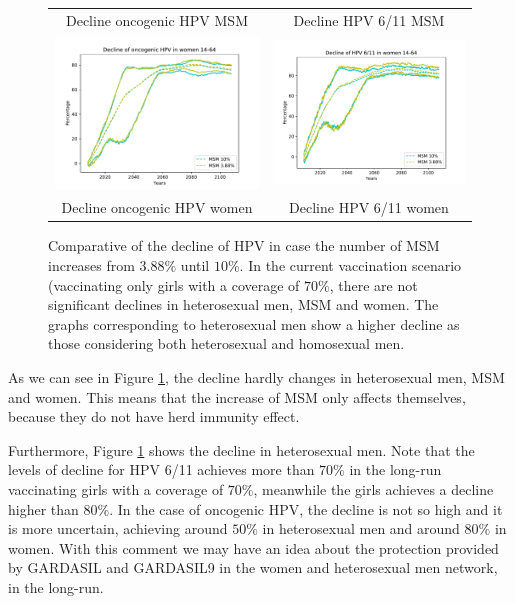 \begin{figure}[!]
\begin{tabular}{cc}
		Decline oncogenic HPV MSM	& Decline HPV 6/11 MSM \\ 
		\includegraphics[width=0.5\linewidth]{IMGs/13.-Aumento_MSM/onco_muj.pdf}	& 
		\includegraphics[width=0.5\linewidth]{IMGs/13.-Aumento_MSM/verr_muj.pdf}  \\ 
		Decline oncogenic HPV women	& Decline HPV 6/11 women \\ 
	\end{tabular} 
	\caption{Comparative of the decline of HPV in case the number of MSM increases from $3.88\%$ until $10\%$. In the current vaccination scenario (vaccinating only girls with a coverage of $70\%$, there are not significant declines in heterosexual men, MSM and women. The graphs corresponding to heterosexual men show a higher decline as those considering both heterosexual and homosexual men.}
	\label{fig:compara_MSM}
\end{figure}

As we can see in Figure \ref{fig:compara_MSM}, the decline hardly changes in heterosexual men, MSM and women. This means that the increase of MSM only affects themselves, because they do not have herd immunity effect.

Furthermore, Figure \ref{fig:compara_MSM} shows the decline in heterosexual men. Note that the levels of decline for HPV 6/11 achieves more than $70\%$ in the long-run vaccinating girls with a coverage of $70\%$, meanwhile the girls achieves a decline higher than $80\%$. In the case of oncogenic HPV, the decline is not so high and it is more uncertain, achieving around $50\%$ in heterosexual men and around $80\%$ in women. With this comment we may have an idea about the protection provided by GARDASIL and GARDASIL9 in the women and heterosexual men network, in the long-run.